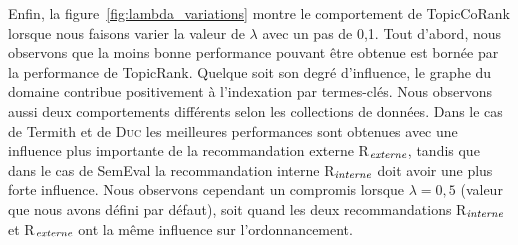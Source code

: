         Enfin, la figure~\ref{fig:lambda_variations} montre le comportement de
        TopicCoRank lorsque nous faisons varier la valeur de $\lambda$ avec un
        pas de 0,1. Tout d'abord, nous observons que la moins bonne performance
        pouvant être obtenue est bornée par la performance de TopicRank. Quelque
        soit son degré d'influence, le graphe du domaine contribue positivement
        à l'indexation par termes-clés. Nous observons aussi deux comportements
        différents selon les collections de données. Dans le cas de Termith et
        de \textsc{Duc} les meilleures performances sont obtenues avec une
        influence plus importante de la recommandation externe
        R$_\textnormal{\textit{externe}}$, tandis que dans le cas de SemEval la
        recommandation interne R$_\textnormal{\textit{interne}}$ doit avoir une
        plus forte influence. Nous observons cependant un compromis lorsque
        $\lambda = 0,5$ (valeur que nous avons défini par défaut), soit quand
        les deux recommandations R$_\textnormal{\textit{interne}}$ et
        R$_\textnormal{\textit{externe}}$ ont la même influence sur
        l'ordonnancement.
        

        
      
